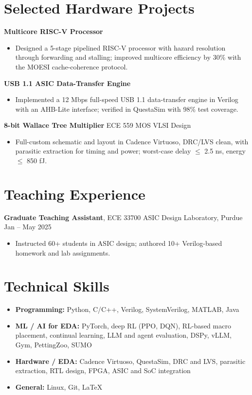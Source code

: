 \documentclass[11pt, letterpaper]{article}
\begin{document}
\section{Selected Hardware Projects}
\textbf{Multicore RISC-V Processor}
\begin{itemize}
    \item Designed a 5-stage pipelined RISC-V processor with hazard resolution through forwarding and stalling; improved multicore efficiency by 30\% with the MOESI cache-coherence protocol.
\end{itemize}
\textbf{USB 1.1 ASIC Data-Transfer Engine}
\begin{itemize}
    \item Implemented a 12 Mbps full-speed USB 1.1 data-transfer engine in Verilog with an AHB-Lite interface; verified in QuestaSim with 98\% test coverage.
\end{itemize}
\textbf{8-bit Wallace Tree Multiplier} \hfill ECE 559 MOS VLSI Design
\begin{itemize}
    \item Full-custom schematic and layout in Cadence Virtuoso, DRC/LVS clean, with parasitic extraction for timing and power; worst-case delay $\leq$ 2.5 ns, energy $\leq$ 850 fJ.
\end{itemize}

\section{Teaching Experience}
\textbf{Graduate Teaching Assistant}, ECE 33700 ASIC Design Laboratory, Purdue \hfill Jan -- May 2025
\begin{itemize}
    \item Instructed 60+ students in ASIC design; authored 10+ Verilog-based homework and lab assignments.
\end{itemize}

\section{Technical Skills}
\begin{itemize}
    \item \textbf{Programming:} Python, C/C++, Verilog, SystemVerilog, MATLAB, Java
    \item \textbf{ML / AI for EDA:} PyTorch, deep RL (PPO, DQN), RL-based macro placement, continual learning, LLM and agent evaluation, DSPy, vLLM, Gym, PettingZoo, SUMO
    \item \textbf{Hardware / EDA:} Cadence Virtuoso, QuestaSim, DRC and LVS, parasitic extraction, RTL design, FPGA, ASIC and SoC integration
    \item \textbf{General:} Linux, Git, \LaTeX
\end{itemize}
\end{document}
